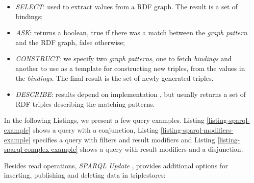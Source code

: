 \begin{itemize}
    \item \emph{SELECT}: used to extract values from a \gls{RDF} graph. The result is a set of bindings;
    \item \emph{ASK}: returns a boolean, true if there was a match between the \emph{graph pattern} and the \gls{RDF} graph, false otherwise; 
    \item \emph{CONSTRUCT}: we specify two \emph{graph patterns}, one to fetch \emph{bindings} and another to use as a template for constructing new triples, from the values in the \emph{bindings}. The final result is the set of newly generated triples.
    \item \emph{DESCRIBE}: results depend on implementation \autocite{Picalausa2011-ca}, but usually returns a set of RDF triples describing the matching patterns. 
\end{itemize}

In the following Listings, we present a few query examples. Listing \ref{listing-sparql-example} shows a query with a conjunction, Listing \ref{listing-sparql-modifiers-example} specifies a query with filters and result modifiers and Listing \ref{listing-sparql-complex-example} shows a query with result modifiers and a disjunction.

\pagebreak







Besides read operations, \emph{\gls{SPARQL} Update} \autocite{W3c_undated-tw}, provides additional options for inserting, publishing and deleting data in triplestores:

